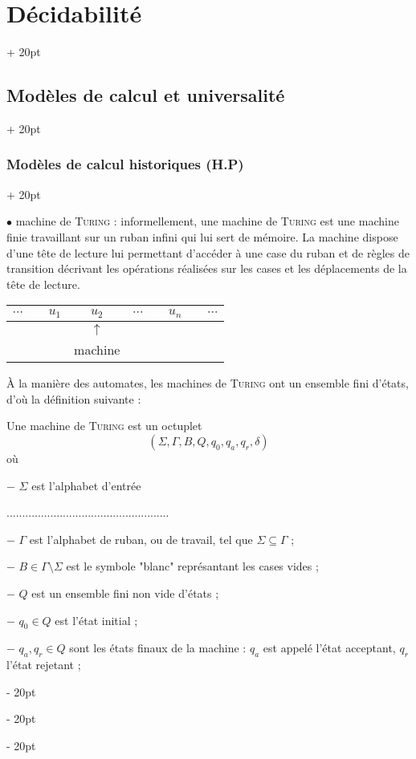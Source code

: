 \documentclass[a4paper, 12pt, twoside]{article}
\newcommand{\lr}[1]{\left( #1 \right)}
\newcommand{\ind}[1][20pt]{\advance\leftskip + #1}
\newcommand{\deind}[1][20pt]{\advance\leftskip - #1}
\newenvironment{indt}[2][20pt]{#2 \par \ind[#1]}{\par \deind} %
\begin{document}
\begin{indt}{\section{Décidabilité}}
\begin{indt}{\subsection{Modèles de calcul et universalité}}
\begin{indt}{\subsubsection{Modèles de calcul historiques (H.P)}}
                \vspace{6pt}
                
                $\bullet$ machine de \textsc{Turing} : informellement, une machine de \textsc{Turing} est une machine finie travaillant sur un ruban infini qui lui sert de mémoire.
                La machine dispose d'une tête de lecture lui permettant d'accéder à une case du ruban et de règles de transition décrivant les opérations réalisées sur les cases et les déplacements de la tête de lecture.

                \begin{center}
                    \begin{tabular}{ccccccccccc}
                        \hline
                        $\cdots$ & \vline & $u_1$ & \vline & $u_2$ & \vline & $\cdots$ & \vline & $u_n$ & \vline & $\cdots$
                        \\
                        \hline
                                 &&&& $\uparrow$
                        \\
                                 &&& \multicolumn{3}{c}{machine}
                    \end{tabular}
                \end{center}

                \`A la manière des automates, les machines de \textsc{Turing} ont un ensemble fini d'états, d'où la définition suivante :

                \begin{emphBox}
                    Une machine de \textsc{Turing} est un octuplet
                    \[
                        \lr{\Sigma, \Gamma, B, Q, q_0, q_a, q_r, \delta}
                    \]
                    où

                    $-$ $\Sigma$ est l'alphabet d'entrée 

                    ....................................................

                    $-$ $\Gamma$ est l'alphabet de ruban, ou de travail, tel que $\Sigma \subseteq \Gamma$ ;

                    $-$ $B \in \Gamma \setminus \Sigma$ est le symbole "blanc" représantant les cases vides ;

                    $-$ $Q$ est un ensemble fini non vide d'états ;

                    $-$ $q_0 \in Q$ est l'état initial ;

                    $-$ $q_a, q_r \in Q$ sont les états finaux de la machine : $q_a$ est appelé l'état acceptant, $q_r$ l'état rejetant ;


\end{emphBox}
\end{indt}
\end{indt}
\end{indt}
\end{document}
